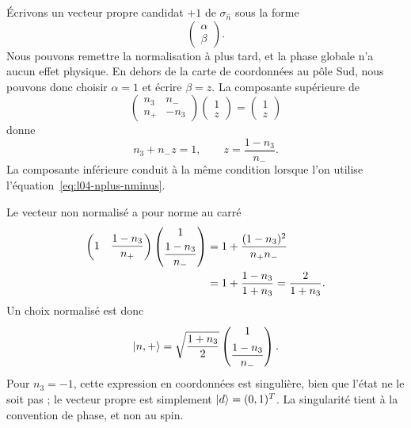 Écrivons un vecteur propre candidat \(+1\) de \(\sigma_{\hat n}\) sous la forme
\begin{equation}
  \begin{pmatrix}\alpha\\\beta\end{pmatrix}.
\end{equation}
Nous pouvons remettre la normalisation à plus tard, et la phase globale n’a aucun effet physique. En dehors de la carte de coordonnées au pôle Sud, nous pouvons donc choisir \(\alpha=1\) et écrire \(\beta=z\). La composante supérieure de
\begin{equation}
  \begin{pmatrix}
    n_3&n_-\\
    n_+&-n_3
  \end{pmatrix}
  \begin{pmatrix}1\\z\end{pmatrix}
  =
  \begin{pmatrix}1\\z\end{pmatrix}
\end{equation}
donne
\begin{equation}
  n_3+n_-z=1,
  \qquad
  z=\frac{1-n_3}{n_-}.
  \label{eq:l04-z-solution}
\end{equation}
La composante inférieure conduit à la même condition lorsque l’on utilise l’équation~\eqref{eq:l04-nplus-nminus}.

Le vecteur non normalisé a pour norme au carré
\begin{align}
  \begin{pmatrix}
    1&\dfrac{1-n_3}{n_+}
  \end{pmatrix}
  \begin{pmatrix}
    1\\[3pt]\dfrac{1-n_3}{n_-}
  \end{pmatrix}
  &=
  1+\frac{(1-n_3)^2}{n_+n_-}
  \notag\\
  &=
  1+\frac{1-n_3}{1+n_3}
  =
  \frac{2}{1+n_3}.
  \label{eq:l04-unnormalized-norm}
\end{align}
Un choix normalisé est donc
\begin{equation}
  \left\lvert n,+\right\rangle
  =
  \sqrt{\frac{1+n_3}{2}}
  \begin{pmatrix}
    1\\[5pt]\dfrac{1-n_3}{n_-}
  \end{pmatrix}.
  \label{eq:l04-normalized-n-state}
\end{equation}
Pour \(n_3=-1\), cette expression en coordonnées est singulière, bien que l’état ne le soit pas ; le vecteur propre est simplement \(\left\lvert d\right\rangle=(0,1)^T\). La singularité tient à la convention de phase, et non au spin.

